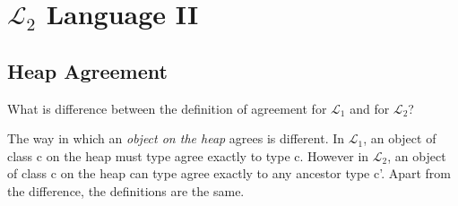 
\chapter{$\mathcal{L}_2$ Language II}


\section{Heap Agreement}


\begin{example}
What is difference between the definition of agreement for $\mathcal{L}_1$ and for $\mathcal{L}_2$?

The way in which an \textit{object on the heap} agrees is different. 
In $\mathcal{L}_1$, an object of class c on the heap must type agree exactly to type c. 
However in $\mathcal{L}_2$, an object of class c on the heap can type agree exactly to any ancestor type c'. 
Apart from the difference, the definitions are the same.
\end{example}